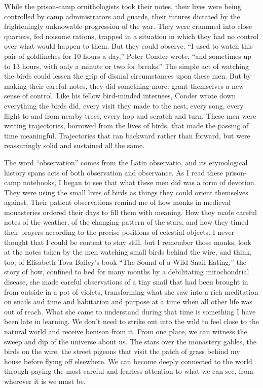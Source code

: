 While the prison-camp ornithologists took their notes, their lives were
being controlled by camp administrators and guards, their futures
dictated by the frighteningly unknowable progression of the war. They
were crammed into close quarters, fed noisome rations, trapped in a
situation in which they had no control over what would happen to them.
But they could observe. ``I used to watch this pair of goldfinches for
10 hours a day,'' Peter Conder wrote, ``and sometimes up to 13 hours,
with only a minute or two for breaks.'' The simple act of watching the
birds could lessen the grip of dismal circumstances upon these men. But
by making their careful notes, they did something more: grant themselves
a new sense of control. Like his fellow bird-minded internees, Conder
wrote down everything the birds did, every visit they made to the nest,
every song, every flight to and from nearby trees, every hop and scratch
and turn. These men were writing trajectories, borrowed from the lives
of birds, that made the passing of time meaningful. Trajectories that
ran backward rather than forward, but were reassuringly solid and
sustained all the same.

The word ``observation'' comes from the Latin observatio, and its
etymological history spans acts of both observation and observance. As I
read these prison-camp notebooks, I began to see that what these men did
was a form of devotion. They were using the small lives of birds as
things they could orient themselves against. Their patient observations
remind me of how monks in medieval monasteries ordered their days to
fill them with meaning. How they made careful notes of the weather, of
the changing pattern of the stars, and how they timed their prayers
according to the precise positions of celestial objects. I never thought
that I could be content to stay still, but I remember those monks, look
at the notes taken by the men watching small birds behind the wire, and
think, too, of Elisabeth Tova Bailey's book ``The Sound of a Wild Snail
Eating,'' the story of how, confined to bed for many months by a
debilitating mitochondrial disease, she made careful observations of a
tiny snail that had been brought in from outside in a pot of violets,
transforming what she saw into a rich meditation on snails and time and
habitation and purpose at a time when all other life was out of reach.
What she came to understand during that time is something I have been
late in learning. We don't need to strike out into the wild to feel
close to the natural world and receive benison from it. From one place,
we can witness the sweep and dip of the universe about us. The stars
over the monastery gables, the birds on the wire, the street pigeons
that visit the patch of grass behind my house before flying off
elsewhere. We can become deeply connected to the world through paying
the most careful and fearless attention to what we can see, from
wherever it is we must be.

